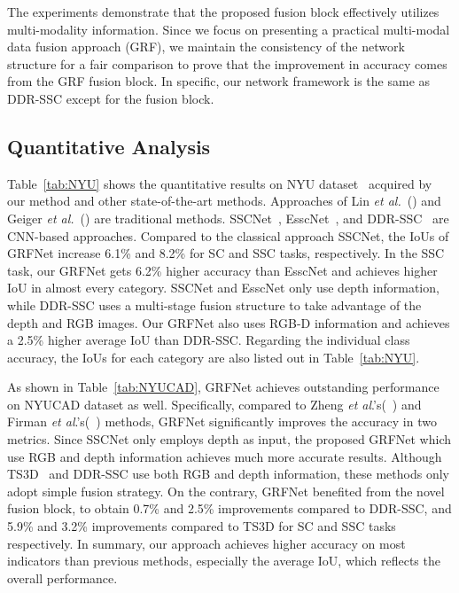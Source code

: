 \documentclass[10pt,twocolumn,letterpaper]{article}
\def\etal{\emph{et al}.}
\begin{document}
The experiments demonstrate that the proposed fusion block effectively utilizes multi-modality information. Since we focus on presenting a practical multi-modal data fusion approach (GRF), we maintain the consistency of the network structure for a fair comparison to prove that the improvement in accuracy comes from the GRF fusion block. In specific, our network framework is the same as DDR-SSC except for the fusion block.

\vspace{-0.1cm}
\subsection{Quantitative Analysis}
\vspace{-0.1cm}
Table~\ref{tab:NYU} shows the quantitative results on NYU dataset~\cite{silberman2012indoor} acquired by our method and other state-of-the-art methods. Approaches of Lin \emph{et al.}~(\cite{lin2013holistic}) and Geiger \emph{et al.}~(\cite{geiger2015joint}) are traditional methods. SSCNet~\cite{song2017_SSCNet}, EsscNet~\cite{zhang2018efficient}, and DDR-SSC~\cite{li2019rgbd} are CNN-based approaches.
Compared to the classical approach SSCNet, the IoUs of GRFNet increase 6.1\% and 8.2\% for SC and SSC tasks, respectively.
In the SSC task, our GRFNet gets 6.2\% higher accuracy than EsscNet and achieves higher IoU in almost every category.
SSCNet and EsscNet only use depth information, while DDR-SSC uses a multi-stage fusion structure to take advantage of the depth and RGB images.
Our GRFNet also uses RGB-D information and achieves a 2.5\% higher average IoU than DDR-SSC.
Regarding the individual class accuracy, the IoUs for each category are also listed out in Table~\ref{tab:NYU}. 


As shown in Table~\ref{tab:NYUCAD}, GRFNet achieves outstanding performance on NYUCAD dataset as well. Specifically, compared to Zheng \etal's(~\cite{zheng2013beyond}) and Firman \etal's(~\cite{firman2016NYUCAD}) methods, GRFNet significantly improves the accuracy in two metrics. 
Since SSCNet only employs depth as input, the proposed GRFNet which use RGB and depth information achieves much more accurate results.
Although TS3D~\cite{Garbade2018_twoStream} and DDR-SSC use both RGB and depth information, these methods only adopt simple fusion strategy. On the contrary, GRFNet benefited from the novel fusion block, to obtain 0.7\% and 2.5\% improvements compared to DDR-SSC, and 5.9\% and 3.2\% improvements compared to TS3D for SC and SSC tasks respectively.
In summary, our approach achieves higher accuracy on most indicators than previous methods, especially the average IoU, which reflects the overall performance.
\end{document}
